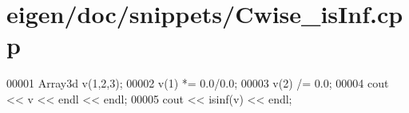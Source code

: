 \hypertarget{eigen_2doc_2snippets_2_cwise__is_inf_8cpp_source}{}\section{eigen/doc/snippets/\+Cwise\+\_\+is\+Inf.cpp}
\label{eigen_2doc_2snippets_2_cwise__is_inf_8cpp_source}

\begin{DoxyCode}
00001 Array3d v(1,2,3);
00002 v(1) *= 0.0/0.0;
00003 v(2) /= 0.0;
00004 cout << v << endl << endl;
00005 cout << isinf(v) << endl;
\end{DoxyCode}
